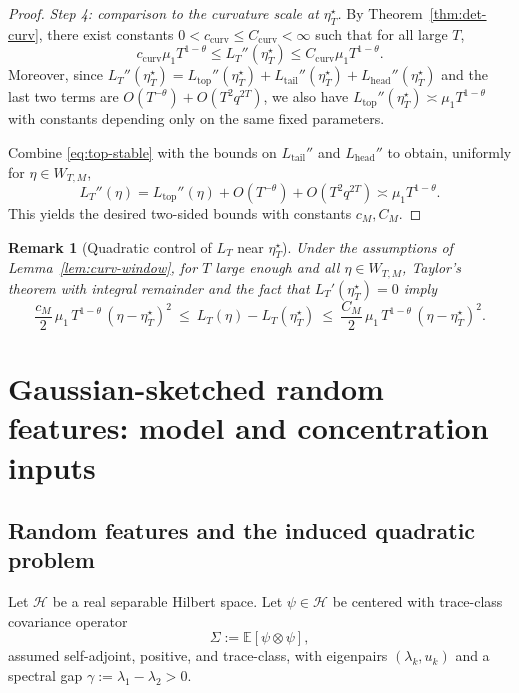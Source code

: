 \documentclass[11pt]{article}
\newtheorem{remark}{Remark}
\begin{document}
\begin{proof}
\medskip\noindent
\emph{Step 4: comparison to the curvature scale at $\eta_T^\star$.}
By Theorem~\ref{thm:det-curv}, there exist constants $0<c_{\mathrm{curv}}\le C_{\mathrm{curv}}<\infty$
such that for all large $T$,
\begin{equation}\label{eq:curv-star-scale}
c_{\mathrm{curv}}\mu_1 T^{1-\theta}
\le
L_T''(\eta_T^\star)
\le
C_{\mathrm{curv}}\mu_1 T^{1-\theta}.
\end{equation}
Moreover, since $L_T''(\eta_T^\star)=L_{\mathrm{top}}''(\eta_T^\star)+L_{\mathrm{tail}}''(\eta_T^\star)+L_{\mathrm{head}}''(\eta_T^\star)$
and the last two terms are $O(T^{-\theta})+O(T^2q^{2T})$, we also have
$L_{\mathrm{top}}''(\eta_T^\star)\asymp \mu_1 T^{1-\theta}$ with constants depending only on the same fixed parameters.

Combine \eqref{eq:top-stable} with the bounds on $L_{\mathrm{tail}}''$ and $L_{\mathrm{head}}''$ to obtain, uniformly for $\eta\in W_{T,M}$,
\[
L_T''(\eta)
=
L_{\mathrm{top}}''(\eta)+O(T^{-\theta})+O(T^2q^{2T})
\asymp
\mu_1 T^{1-\theta}.
\]
This yields the desired two-sided bounds with constants $c_M,C_M$.
\end{proof}

\begin{remark}[Quadratic control of $L_T$ near $\eta_T^\star$]
\label{rem:quad-window}
Under the assumptions of Lemma~\ref{lem:curv-window}, for $T$ large enough and all $\eta\in W_{T,M}$,
Taylor's theorem with integral remainder and the fact that $L_T'(\eta_T^\star)=0$ imply
\[
\frac{c_M}{2}\,\mu_1\,T^{1-\theta}\,(\eta-\eta_T^\star)^2
\ \le\
L_T(\eta)-L_T(\eta_T^\star)
\ \le\
\frac{C_M}{2}\,\mu_1\,T^{1-\theta}\,(\eta-\eta_T^\star)^2.
\]
\end{remark}


\section{Gaussian-sketched random features: model and concentration inputs}
\label{sec:rf}

\subsection{Random features and the induced quadratic problem}

Let $\mathcal H$ be a real separable Hilbert space. Let $\psi\in\mathcal H$ be centered with
trace-class covariance operator
\[
\Sigma:=\mathbb E[\psi\otimes\psi],
\]
assumed self-adjoint, positive, and trace-class, with eigenpairs $(\lambda_k,u_k)$
and a spectral gap $\gamma:=\lambda_1-\lambda_2>0$.
\end{document}
